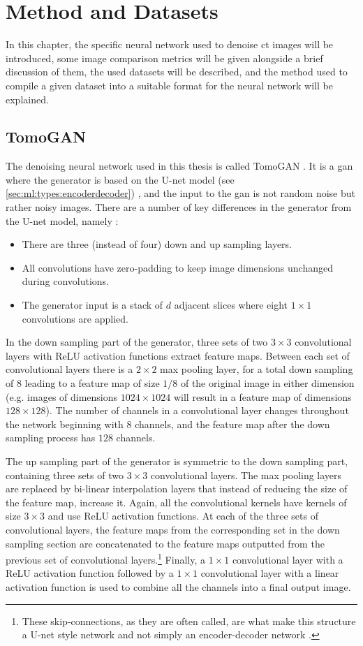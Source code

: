 \chapter{Method and Datasets}
\label{sec:method}
In this chapter, the specific neural network used to denoise \gls{ct} images will be introduced, some image comparison metrics will be given alongside a brief discussion of them, the used datasets will be described, and the method used to compile a given dataset into a suitable format for the neural network will be explained. 


\section{TomoGAN}
\label{sec:method:tomogan}
The denoising neural network used in this thesis is called TomoGAN \cite{liu2020tomogan}. It is a \gls{gan} where the generator is based on the U-net model (see \cref{sec:ml:types:encoderdecoder}) \cite{unet}, and the input to the \gls{gan} is not random noise but rather noisy images. There are a number of key differences in the generator from the U-net model, namely \cite{liu2020tomogan}:
\begin{itemize}
    \item There are three (instead of four) down and up sampling layers.
    \item All convolutions have zero-padding to keep image dimensions unchanged during convolutions.
    \item The generator input is a stack of $d$ adjacent slices where eight $1\times1$ convolutions are applied. 
\end{itemize}
In the down sampling part of the generator, three sets of two $3\times3$ convolutional layers with ReLU activation functions extract feature maps. Between each set of convolutional layers there is a $2\times2$ max pooling layer, for a total down sampling of $8$ leading to a feature map of size $1/8$ of the original image in either dimension (e.g. images of dimensions $1024\times1024$ will result in a feature map of dimensions $128\times128$). The number of channels in a convolutional layer changes throughout the network beginning with $8$ channels, and the feature map after the down sampling process has $128$ channels. 

The up sampling part of the generator is symmetric to the down sampling part, containing three sets of two $3\times3$ convolutional layers. The max pooling layers are replaced by bi-linear interpolation layers that instead of reducing the size of the feature map, increase it. Again, all the convolutional kernels have kernels of size $3\times3$ and use ReLU activation functions. At each of the three sets of convolutional layers, the feature maps from the corresponding set in the down sampling section are concatenated to the feature maps outputted from the previous set of convolutional layers.\footnote{These skip-connections, as they are often called, are what make this structure a U-net style network and not simply an encoder-decoder network \cite{unet}. } Finally, a $1\times1$ convolutional layer with a ReLU activation function followed by a $1\times1$ convolutional layer with a linear activation function is used to combine all the channels into a final output image. 

